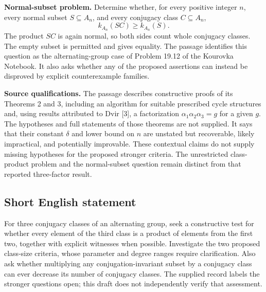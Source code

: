 \documentclass[11pt]{article}
\begin{document}
\textbf{Normal-subset problem.} Determine whether, for every positive integer \(n\), every normal subset \(S\subseteq A_n\), and every conjugacy class \(C\subseteq A_n\),
\[
k_{A_n}(SC)\geq k_{A_n}(S).
\]
The product \(SC\) is again normal, so both sides count whole conjugacy classes. The empty subset is permitted and gives equality. The passage identifies this question as the alternating-group case of Problem 19.12 of the Kourovka Notebook. It also asks whether any of the proposed assertions can instead be disproved by explicit counterexample families.

\textbf{Source qualifications.} The passage describes constructive proofs of its Theorems 2 and 3, including an algorithm for suitable prescribed cycle structures and, using results attributed to Dvir [3], a factorization \(\alpha_1\alpha_2\alpha_3=g\) for a given \(g\). The hypotheses and full statements of those theorems are not supplied. It says that their constant \(\delta\) and lower bound on \(n\) are unstated but recoverable, likely impractical, and potentially improvable. These contextual claims do not supply missing hypotheses for the proposed stronger criteria. The unrestricted class-product problem and the normal-subset question remain distinct from that reported three-factor result.
\subsection{Short English statement}
For three conjugacy classes of an alternating group, seek a constructive test for whether every element of the third class is a product of elements from the first two, together with explicit witnesses when possible. Investigate the two proposed class-size criteria, whose parameter and degree ranges require clarification. Also ask whether multiplying any conjugation-invariant subset by a conjugacy class can ever decrease its number of conjugacy classes. The supplied record labels the stronger questions open; this draft does not independently verify that assessment.
\end{document}
